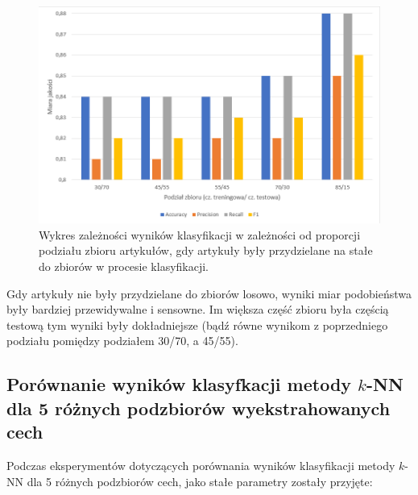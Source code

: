 \documentclass{classrep}
\begin{document}
\begin{figure}[H]
    \centering
    \includegraphics[width=14cm]{ranges_const_bar_chart.png}
    \caption{Wykres zależności wyników klasyfikacji w zależności od proporcji podziału zbioru artykułów, gdy artykuły były przydzielane na stałe do zbiorów w procesie klasyfikacji.}
    \label{wykres:proporcja_stale}
\end{figure}


Gdy artykuły nie były przydzielane do zbiorów losowo, wyniki miar podobieństwa były bardziej przewidywalne i sensowne. Im większa część zbioru była częścią testową tym wyniki były dokładniejsze (bądź równe wynikom z poprzedniego podziału pomiędzy podziałem 30/70, a 45/55).

\subsection{Porównanie wyników klasyfkacji metody $k$-NN dla 5 różnych podzbiorów wyekstrahowanych cech}
Podczas eksperymentów dotyczących porównania wyników klasyfikacji metody $k$-NN dla 5 różnych podzbiorów cech, jako stałe parametry zostały przyjęte:
\end{document}
